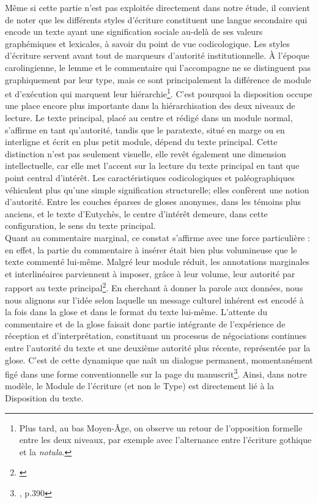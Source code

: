 \documentclass[a4paper, twoside, 12pt]{book}
\begin{document}
{Même si cette partie n'est pas exploitée directement dans notre étude, il convient de noter que les différents styles d'écriture constituent une langue secondaire qui encode un texte ayant une signification sociale au-delà de ses valeurs graphémiques et lexicales, à savoir du point de vue codicologique. Les styles d'écriture servent avant tout de marqueurs d'autorité institutionnelle. À l'époque carolingienne, le lemme et le commentaire qui l'accompagne ne se distinguent pas graphiquement par leur \og{}type\fg{}, mais ce sont principalement la différence de module et d'exécution qui marquent leur hiérarchie\footnote{Plus tard, au bas Moyen-Âge,  on observe un retour de l'opposition formelle entre les deux niveaux, par exemple avec l'alternance entre l'écriture gothique et la \textit{notula}.}. C'est pourquoi la disposition occupe une place encore plus importante dans la hiérarchisation des deux niveaux de lecture. Le texte principal, placé au centre et rédigé dans un module normal, s'affirme en tant qu'autorité, tandis que le \og{}paratexte\fg{}, situé en marge ou en interligne et écrit en plus petit module, dépend du texte principal. Cette distinction n'est pas seulement visuelle, elle revêt également une dimension intellectuelle, car elle met l'accent sur la lecture du texte principal en tant que point central d'intérêt. Les caractéristiques codicologiques et paléographiques véhiculent plus qu'une simple signification structurelle; elles confèrent une notion d'autorité. Entre les couches éparses de gloses anonymes, dans les témoins plus anciens, et le texte d'Eutychès, le centre d'intérêt demeure, dans cette configuration, le sens du texte principal.\\

Quant au commentaire marginal, ce constat s'affirme avec une force particulière : en effet, la partie du commentaire à insérer était bien plus volumineuse que le texte commenté lui-même. Malgré leur module réduit, les annotations marginales et interlinéaires parviennent à imposer, grâce à leur volume, leur autorité par rapport au texte principal\footnote{\cite{zetzel2005marginal}}. En cherchant à donner la parole aux données, nous nous alignons sur l'idée selon laquelle un message culturel inhérent est encodé à la fois dans la glose et dans le format du texte lui-même. L'attente du commentaire et de la glose faisait donc partie intégrante de l'expérience de réception et d'interprétation, constituant un processus de négociations continues entre l'autorité du texte et une deuxième autorité plus récente, représentée par la glose. C'est de cette dynamique que naît un dialogue permanent, momentanément figé dans une forme conventionnelle sur la page du manuscrit\footnote{\cite{irvine1994making}, p.390}. Ainsi, dans notre modèle, le \og{}Module\fg{} de l'écriture (et non le \og{}Type\fg{}) est directement lié à la \og{}Disposition\fg{} du texte.\\ 

}
\end{document}
